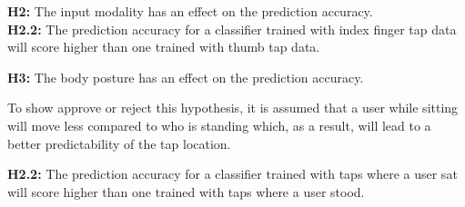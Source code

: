 \begin{center}
  \begin{mdframed}[backgroundcolor=green!005]
    \textbf{H2:} The input modality has an effect on the prediction accuracy.\\
    \hline
    \textbf{H2.2:} The prediction accuracy for a classifier trained with index finger tap data will score higher than one trained with thumb tap data.
  \end{mdframed}
\end{center}




\begin{center}
  \begin{framed}
    \textbf{H3:} The body posture has an effect on the prediction accuracy.
  \end{framed}
\end{center}

To show approve or reject this hypothesis, it is assumed that a user while sitting will move less compared to who is standing which, as a result, will lead to a better predictability of the tap location.

\begin{center}
  \begin{framed}
    \textbf{H2.2:} The prediction accuracy for a classifier trained with taps where a user sat will score higher than one trained with taps where a user stood.
  \end{framed}
\end{center}
